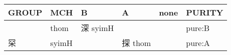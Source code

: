 \documentclass[14pt,a4paper]{scrartcl}
\begin{document}
\begin{longtable}[c]{@{}llllll@{}}
\toprule
\begin{minipage}[b]{0.14\columnwidth}\raggedright\strut
GROUP
\strut\end{minipage} &
\begin{minipage}[b]{0.14\columnwidth}\raggedright\strut
MCH
\strut\end{minipage} &
\begin{minipage}[b]{0.14\columnwidth}\raggedright\strut
B
\strut\end{minipage} &
\begin{minipage}[b]{0.14\columnwidth}\raggedright\strut
A
\strut\end{minipage} &
\begin{minipage}[b]{0.14\columnwidth}\raggedright\strut
none
\strut\end{minipage} &
\begin{minipage}[b]{0.14\columnwidth}\raggedright\strut
PURITY
\strut\end{minipage}\tabularnewline
\midrule
\endhead
\begin{minipage}[t]{0.14\columnwidth}\raggedright\strut
𥥍
\strut\end{minipage} &
\begin{minipage}[t]{0.14\columnwidth}\raggedright\strut
thom
\strut\end{minipage} &
\begin{minipage}[t]{0.14\columnwidth}\raggedright\strut
深 syimH
\strut\end{minipage} &
\begin{minipage}[t]{0.14\columnwidth}\raggedright\strut
\strut\end{minipage} &
\begin{minipage}[t]{0.14\columnwidth}\raggedright\strut
\strut\end{minipage} &
\begin{minipage}[t]{0.14\columnwidth}\raggedright\strut
pure:B
\strut\end{minipage}\tabularnewline
\begin{minipage}[t]{0.14\columnwidth}\raggedright\strut
罙
\strut\end{minipage} &
\begin{minipage}[t]{0.14\columnwidth}\raggedright\strut
syimH
\strut\end{minipage} &
\begin{minipage}[t]{0.14\columnwidth}\raggedright\strut
\strut\end{minipage} &
\begin{minipage}[t]{0.14\columnwidth}\raggedright\strut
探 thom
\strut\end{minipage} &
\begin{minipage}[t]{0.14\columnwidth}\raggedright\strut
\strut\end{minipage} &
\begin{minipage}[t]{0.14\columnwidth}\raggedright\strut
pure:A
\strut\end{minipage}\tabularnewline
\bottomrule
\end{longtable}
\end{document}
